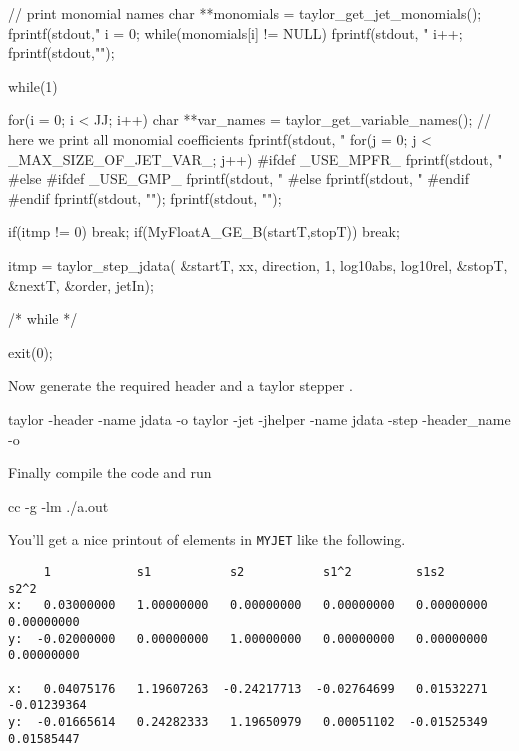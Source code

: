\documentclass[10pt]{article}
\theoremstyle{remark}
\newcommand{\myjet}{{\tt MY\symbol{95}JET}}
\newcommand{\inputfile}{}
\newcommand{\mainfile}{}
\newcommand{\odecfile}{}
\newcommand{\odehfile}{}
\begin{document}
\begin{code}[title={File: \mainfile{}}]
{    	 // print monomial names
    	 {
    	   char **monomials = taylor_get_jet_monomials();
    	   fprintf(stdout,"%
    	   i = 0;
    	   while(monomials[i] != NULL) {
    	     fprintf(stdout, "%
    	     i++;
    	   }
    	   fprintf(stdout,"\n");
    	 }
    	 
    	 while(1)  {
    	   for(i = 0; i < JJ; i++) {
    	     char **var_names = taylor_get_variable_names();
    	     // here we print all monomial coefficients	   	     
    	     fprintf(stdout, "%
    	     for(j = 0; j < _MAX_SIZE_OF_JET_VAR_; j++) {
    #ifdef _USE_MPFR_	 	       
    	       fprintf(stdout, "%
    #else
    #ifdef _USE_GMP_
    	       fprintf(stdout, "%
    #else
    	       fprintf(stdout, "%
    #endif
    #endif	       
    	     }
    	     fprintf(stdout, "\n");	     
    	   }
    	   fprintf(stdout, "\n");	     	   
    	   
    	   if(itmp != 0) {break;} 
    	   if(MyFloatA_GE_B(startT,stopT)) { break;}
    	   
    	   itmp = taylor_step_jdata( &startT, xx, direction, 1, 
    	                             log10abs, log10rel, 
    	                             &stopT, &nextT, &order, jetIn);
    
    	 }  /* while */
    	 
    	 exit(0); 
     }   
\end{code}
Now generate the required header \odehfile{} and a taylor stepper \odecfile{}.
\begin{command}
   taylor -header -name jdata -o \odehfile{} \inputfile{} 
   taylor -jet -jhelper -name jdata -step -header_name \odehfile{} \inputfile{} -o \odecfile{}
\end{command}
Finally compile the code and run
\begin{command}
    cc -g \odecfile{} \mainfile{} -lm
    ./a.out
\end{command}
You'll get a nice printout of elements in \myjet{} like the following.
\begin{verbatim}
     1            s1           s2           s1^2         s1s2         s2^2         
x:   0.03000000   1.00000000   0.00000000   0.00000000   0.00000000   0.00000000 
y:  -0.02000000   0.00000000   1.00000000   0.00000000   0.00000000   0.00000000 

x:   0.04075176   1.19607263  -0.24217713  -0.02764699   0.01532271  -0.01239364 
y:  -0.01665614   0.24282333   1.19650979   0.00051102  -0.01525349   0.01585447 
\end{verbatim}
\end{document}
